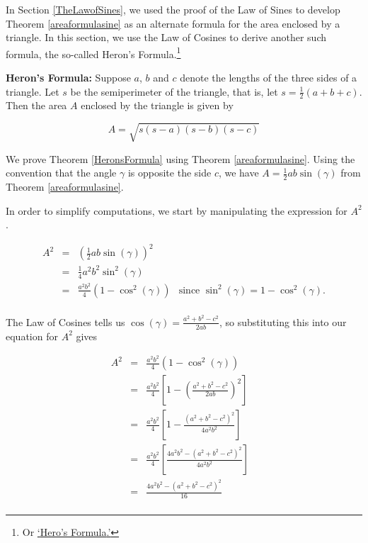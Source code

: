 \documentclass{ximera}
\begin{document}
In Section \ref{TheLawofSines}, we used the proof of the Law of Sines to develop Theorem \ref{areaformulasine} as an alternate formula for the area enclosed by a triangle.  In this section, we use the Law of Cosines to derive another such formula,  the so-called Heron's Formula.\footnote{Or \href{http://bit.ly/2rwhWoJ}{`\underline{Hero's Formula}.'}}

 


\begin{theorem}  \label{HeronsFormula}   \textbf{Heron's Formula:} Suppose $a$, $b$ and $c$ denote the lengths of the three sides of a triangle.  Let $s$ be the semiperimeter of the triangle, that is, let $s = \frac{1}{2}(a + b + c)$.  Then the area $A$ enclosed by the triangle is given by

\[ A = \sqrt{s (s-a) (s-b) (s-c)}\]

 

\end{theorem}


 

We prove Theorem \ref{HeronsFormula} using Theorem \ref{areaformulasine}.  Using the convention that the angle $\gamma$ is opposite the side $c$,  we have $A = \frac{1}{2} ab \sin(\gamma)$ from Theorem \ref{areaformulasine}. 

In order to simplify computations, we start by manipulating the expression for $A^2$.

\[ \begin{array}{rclr} 

A^2 & = & \left(\frac{1}{2} ab \sin(\gamma)\right)^2 &\\  
    & =  &  \frac{1}{4} a^2 b^2 \sin^{2}(\gamma) & \\ 
    & = & \frac{a^2b^2}{4} \left(1 - \cos^{2}(\gamma)\right) & \text{since $\sin^2(\gamma) = 1 - \cos^{2}(\gamma)$.} \\ \end{array}\]

The Law of Cosines tells us $\cos(\gamma) = \frac{a^2 + b^2 - c^2}{2ab}$, so substituting this into our equation for $A^2$ gives

\[ \begin{array}{rclr}

A^2 & = &  \frac{a^2b^2}{4} \left(1 - \cos^{2}(\gamma)\right) 	& \\ 

    & = & \frac{a^2b^2}{4} \left[1 - \left( \frac{a^2 + b^2 - c^2}{2ab} \right)^2\right] &  \\  
    
	 	& = & \frac{a^2b^2}{4} \left[1 - \frac{\left(a^2 + b^2 - c^2\right)^2}{4a^2b^2} \right] &  \\    
		
		& = & \frac{a^2b^2}{4} \left[\frac{4a^2 b^2  - \left(a^2 + b^2 - c^2\right)^2}{4a^2b^2} \right] &   \\  
		
		& = & \frac{4a^2 b^2  - \left(a^2 + b^2 - c^2\right)^2}{16}  &  \\  \end{array} \]
	
\end{document}
